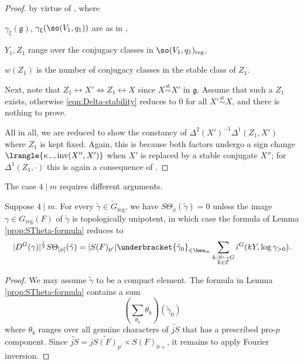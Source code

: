 \documentclass[a4paper,10pt]{article}
\begin{document}
\begin{proof}
	by virtue of \cite[p.155]{Wa97}, where
	\begin{compactitem}
		\item $\gamma_\xi(\mathfrak{g})$, $\gamma_\xi(\so(V_1, q_1))$ are as in \cite[p.154]{Wa97},
		\item $Y_1, Z_1$ range over the conjugacy classes in $\so(V_1, q_1)_\text{reg}$,
		\item $w(Z_1)$ is the number of conjugacy classes in the stable class of $Z_1$.
	\end{compactitem}
	Next, note that $Z_1 \leftrightarrow X' \iff Z_1 \leftrightarrow X$ since $X \stackrel{\text{st}}{\sim} X'$ in $\mathfrak{g}$. Assume that such a $Z_1$ exists, otherwise \eqref{eqn:Delta-stability} reduces to $0$ for all $X' \stackrel{\text{st}}{\sim} X$, and there is nothing to prove.
	
	All in all, we are reduced to show the constancy of $\Delta^2(X')^{-1} \Delta^1(Z_1, X')$ where $Z_1$ is kept fixed. Again, this is because both factors undergo a sign change $\lrangle{\kappa_-, \text{inv}(X'', X') }$ when $X'$ is replaced by a stable conjugate $X''$; for $\Delta^1(Z_1, \cdot)$ this is again a consequence of \cite[X.8]{Wa01}.
\end{proof}

The case $4 \mid m$ requires different arguments.
\begin{lemma}\label{prop:four-vanishing}
	Suppose $4 \mid m$. For every $\tilde{\gamma} \in \tilde{G}_{\mathrm{reg}}$, we have $S\Theta_\phi(\tilde{\gamma}) = 0$ unless the image $\gamma \in G_\mathrm{reg}(F)$ of $\tilde{\gamma}$ is topologically unipotent, in which case the formula of Lemma \ref{prop:STheta-formula} reduces to
	\[ |D^G(\gamma)|^{\frac{1}{2}} S\Theta_{[\phi]}(\tilde{\gamma}) = |S(F)_{p'}| \underbracket{\tilde{\gamma}_0}_{\in \bmu_m} \sum_{\substack{k: S \hookrightarrow G \\ k \in \mathcal{E}}} \hat{\iota}^G(kY, \log \gamma_{>0}). \]
\end{lemma}
\begin{proof}
	We may assume $\tilde{\gamma}$ to be a compact element. The formula in Lemma \ref{prop:STheta-formula} contains a sum
	\[ \left( \sum_{\theta_k} \theta_k \right) (\tilde{\gamma}_0) \]
	where $\theta_k$ ranges over all genuine characters of $\widetilde{jS}$ that has a prescribed pro-$p$ component. Since $\widetilde{jS} = \widetilde{jS(F)_{p'}} \times S(F)_{0+}$, it remains to apply Fourier inversion.
\end{proof}
\end{document}
